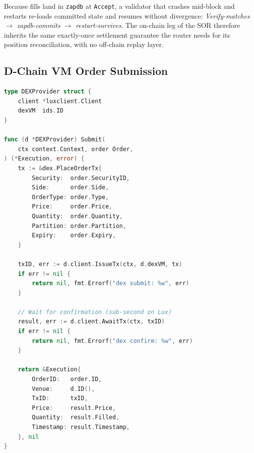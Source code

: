 Because fills land in \texttt{zapdb} at \texttt{Accept}, a validator
that crashes mid-block and restarts re-loads committed state and
resumes without divergence: \emph{Verify-matches $\rightarrow$
zapdb-commits $\rightarrow$ restart-survives}. The on-chain leg of the
SOR therefore inherits the same exactly-once settlement guarantee the
router needs for its position reconciliation, with no off-chain replay
layer.

\subsection{D-Chain VM Order Submission}

\begin{lstlisting}[language=Go,caption={D-Chain VM order submission via SOR. The order is issued as a transaction to the D-Chain; matching and settlement occur in block verification, and \texttt{AwaitTx} returns once the fill is committed to \texttt{zapdb}.}]
type DEXProvider struct {
    client *luxclient.Client
    dexVM  ids.ID
}

func (d *DEXProvider) Submit(
    ctx context.Context, order Order,
) (*Execution, error) {
    tx := &dex.PlaceOrderTx{
        Security:  order.SecurityID,
        Side:      order.Side,
        OrderType: order.Type,
        Price:     order.Price,
        Quantity:  order.Quantity,
        Partition: order.Partition,
        Expiry:    order.Expiry,
    }

    txID, err := d.client.IssueTx(ctx, d.dexVM, tx)
    if err != nil {
        return nil, fmt.Errorf("dex submit: %w", err)
    }

    // Wait for confirmation (sub-second on Lux)
    result, err := d.client.AwaitTx(ctx, txID)
    if err != nil {
        return nil, fmt.Errorf("dex confirm: %w", err)
    }

    return &Execution{
        OrderID:   order.ID,
        Venue:     d.ID(),
        TxID:      txID,
        Price:     result.Price,
        Quantity:  result.Filled,
        Timestamp: result.Timestamp,
    }, nil
}
\end{lstlisting}

